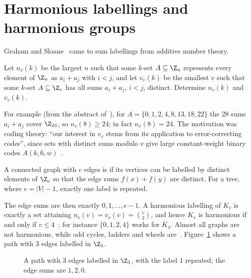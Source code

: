 \section{Harmonious labellings and harmonious groups}\label{sec:harmonious}


Graham and Sloane~\cite{gs80} came to sum labellings from additive number theory.

\begin{problem}\label{prob:additive}
Let $n_v(k)$ be the largest $n$ such that some $k$-set $A\subseteq\Z_n$ represents every element of $\Z_n$ as $a_i+a_j$ with $i<j$, and let $v_v(k)$ be the smallest $v$ such that some $k$-set $A\subseteq\Z_v$ has all sums $a_i+a_j$, $i<j$, distinct. Determine $n_v(k)$ and $v_v(k)$.
\end{problem}

For example (from the abstract of~\cite{gs80}), for $A=\{0,1,2,4,8,13,18,22\}$ the $28$ sums $a_i+a_j$ cover $\Z_{24}$, so $n_v(8)\geq24$; in fact $n_v(8)=24$. The motivation was coding theory: ``our interest in $v_v$ stems from its application to error-correcting codes'', since sets with distinct sums modulo $v$ give large constant-weight binary codes $A(k,6,w)$~\cite[\S1]{gs80}.


\begin{definition}\label{def:harmonious}
A connected graph with $e$ edges is  if its vertices can be labelled by distinct elements of $\Z_e$ so that the edge sums $f(x)+f(y)$ are distinct. For a tree, where $e=|V|-1$, exactly one label is repeated.
\end{definition}

The edge sums are then exactly $0,1,\dots,e-1$. A harmonious labelling of $K_v$ is exactly a set attaining $n_v(v)=v_v(v)=\binom v2$, and hence $K_v$ is harmonious if and only if $v\leq4$~\cite[Theorem~7]{gs80}; for instance $\{0,1,2,4\}$ works for $K_4$. Almost all graphs are not harmonious, while odd cycles, ladders and wheels are~\cite{gs80}. Figure~\ref{fig:harmonious-path} shows a path with $3$ edges labelled in $\Z_3$.

\begin{figure}[ht]
\centering

\caption{A path with $3$ edges labelled in $\Z_3$, with the label $1$ repeated; the edge sums are $1,2,0$.}
\label{fig:harmonious-path}
\end{figure}

